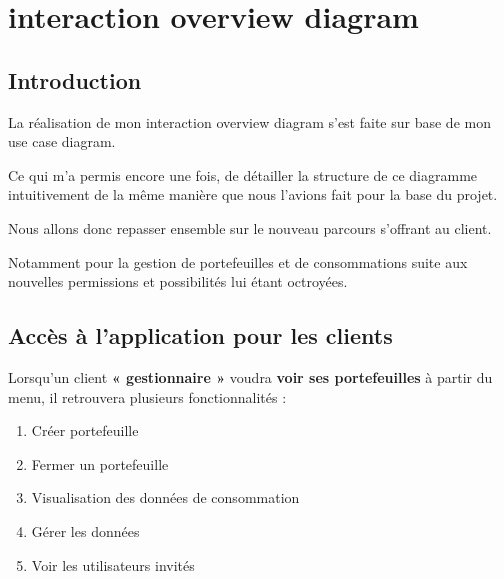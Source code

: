 \section{interaction overview diagram}

\subsection{Introduction}

\begin{flushleft}
La réalisation de mon interaction overview diagram s'est faite sur base de mon use case diagram. 
\end{flushleft}

\begin{flushleft}
Ce qui m'a permis encore une fois, de détailler la structure de ce diagramme intuitivement de la même manière que nous l'avions fait pour la base du projet.
\end{flushleft}

\begin{flushleft}
Nous allons donc repasser ensemble sur le nouveau parcours 
s'offrant au client.
\end{flushleft}

\begin{flushleft}
Notamment pour la gestion de portefeuilles et de consommations suite aux nouvelles permissions et possibilités lui étant 
octroyées.
\end{flushleft}

\newpage

\subsection{Accès à l'application pour les clients}

\begin{flushleft}
Lorsqu’un client \textbf{« gestionnaire »} voudra \textbf{voir ses portefeuilles} à partir du menu, il retrouvera plusieurs fonctionnalités :
\end{flushleft}

\begin{enumerate}[1.]
\item Créer portefeuille
\item Fermer un portefeuille
\item Visualisation des données de consommation
\item Gérer les données
\item Voir les utilisateurs invités
\end{enumerate}

